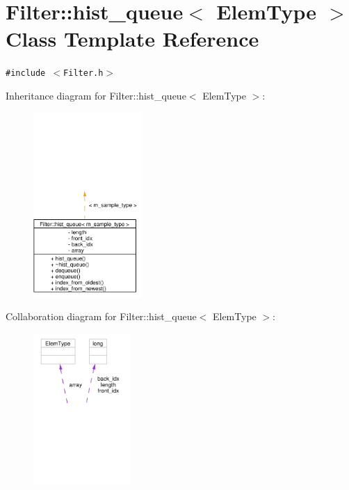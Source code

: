 \hypertarget{classFilter_1_1hist__queue}{
\section{Filter::hist\_\-queue$<$ Elem\-Type $>$ Class Template Reference}
\label{classFilter_1_1hist__queue}
}
{\tt \#include $<$Filter.h$>$}

Inheritance diagram for Filter::hist\_\-queue$<$ Elem\-Type $>$:\begin{figure}[H]
\begin{center}
\leavevmode
\includegraphics[width=117pt]{classFilter_1_1hist__queue__inherit__graph}
\end{center}
\end{figure}
Collaboration diagram for Filter::hist\_\-queue$<$ Elem\-Type $>$:\begin{figure}[H]
\begin{center}
\leavevmode
\includegraphics[width=105pt]{classFilter_1_1hist__queue__coll__graph}
\end{center}
\end{figure}
